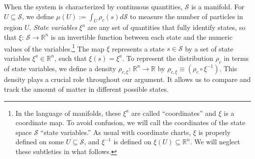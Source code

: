\documentclass[12pt, english, twoside]{article} %
\begin{document}


When the system is characterized by continuous quantities, $\mathcal{S}$ is a manifold. For $U \subseteq \mathcal{S}$, we define $\mu(U) := \int_U \rho_c(s) d\mathcal{S}$ to measure the number of particles in region $U$. \textit{State variables} $\xi^a$ are any set of quantities that fully identify states, so that $\xi$: $\mathcal{S} \to \mathbb{R}^n$ is an invertible function between each state and the numeric values of the variables.\footnote{In the language of manifolds, these $\xi^a$ are called ``coordinates'' and $\xi$ is a coordinate map. To avoid confusion, we will call the coordinates of the state space $\mathcal{S}$ ``state variables.'' As usual with coordinate charts, $\xi$ is properly defined on some $U \subseteq \mathcal{S}$, and $\xi^{-1}$ is defined on $\xi(U) \subseteq \mathbb{R}^n$. We will neglect these subtleties in what follows.} The map $\xi$ represents a state $s \in \mathcal{S}$ by a set of state variables $\xi^a \in \mathbb{R}^n$, such that $\xi (s) = \xi^a$. To represent the distribution $\rho_c$ in terms of state variables, we define a density $\rho_{c, \xi}$: $\mathbb{R}^n \to \mathbb{R}$ by $\rho_{c, \xi} \equiv (\rho_c \circ \xi^{-1})$. This density plays a crucial role throughout our argument. It allows us to compare and track the amount of matter in different possible states.
\end{document}
